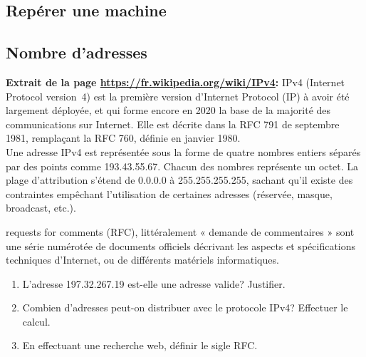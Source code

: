 \documentclass[a4paper,11pt]{article}
\begin{document}
\begin{Form}
\setcounter{section}{1}
\section{Repérer une machine}
\subsection{Nombre d'adresses}
\begin{framed}
\noindent\textbf{Extrait de la page \url{https://fr.wikipedia.org/wiki/IPv4}:} IPv4 (Internet Protocol version~4) est la première version d'Internet Protocol (IP) à avoir été largement déployée, et qui forme encore en 2020 la base de la majorité des communications sur Internet. Elle est décrite dans la RFC 791 de septembre 1981, remplaçant la RFC 760, définie en janvier 1980.\\Une adresse IPv4 est représentée sous la forme de quatre nombres entiers séparés par des points comme 193.43.55.67. Chacun des nombres représente un octet. La plage d'attribution s'étend de 0.0.0.0 à 255.255.255.255, sachant qu'il existe des contraintes empêchant l'utilisation de certaines adresses (réservée, masque, broadcast, etc.).
\end{framed}
\begin{commentprof}
requests for comments (RFC), littéralement « demande de commentaires » sont une série numérotée de documents officiels décrivant les aspects et spécifications techniques d'Internet, ou de différents matériels informatiques.
\end{commentprof}
\begin{enumerate}
\item L'adresse 197.32.267.19 est-elle une adresse valide? Justifier.
\item Combien d'adresses peut-on distribuer avec le protocole IPv4? Effectuer le calcul.
\item En effectuant une recherche web, définir le sigle RFC.
\end{enumerate}

\end{Form}
\end{document}
